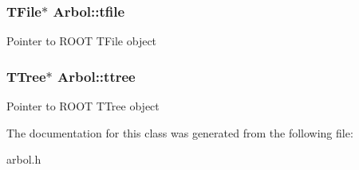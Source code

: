 \subsubsection[{\texorpdfstring{tfile}{tfile}}]{\setlength{\rightskip}{0pt plus 5cm}T\+File$\ast$ Arbol\+::tfile}\hypertarget{classArbol_ae2b0964ee5e90cb2d7beb10810c14b9c}{}\label{classArbol_ae2b0964ee5e90cb2d7beb10810c14b9c}
Pointer to R\+O\+OT T\+File object 
\subsubsection[{\texorpdfstring{ttree}{ttree}}]{\setlength{\rightskip}{0pt plus 5cm}T\+Tree$\ast$ Arbol\+::ttree}\hypertarget{classArbol_abe1c658a04d96bb5bbf6eda7e90acf38}{}\label{classArbol_abe1c658a04d96bb5bbf6eda7e90acf38}
Pointer to R\+O\+OT T\+Tree object 

The documentation for this class was generated from the following file\+:\begin{DoxyCompactItemize}
\item 
arbol.\+h\end{DoxyCompactItemize}
